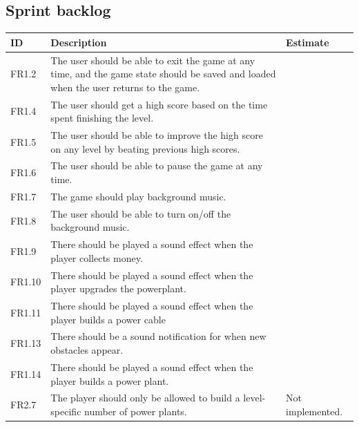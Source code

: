 \subsection{Sprint backlog}
	\begin{table}
	\begin{tabular}{| p{1.2cm} | p{8cm} | p{3cm} |}
		\hline
		\rowcolor{gray}
		ID & Description & Estimate \\ \hline
		FR1.2 &  The user should be able to exit the game at any time, and the game state should be saved and loaded when the user returns to the game. & \\ \hline

		FR1.4 & The user should get a high score based on the time spent finishing the level. & \\ \hline

		FR1.5 & The user should be able to improve the high score on any level by beating previous high scores. & \\ \hline

		FR1.6 & The user should be able to pause the game at any time. & \\ \hline

		FR1.7 & The game should play background music. & \\ \hline

		FR1.8 & The user should be able to turn on/off the background music. & \\ \hline

		FR1.9 & There should be played a sound effect when the player collects money. & \\ \hline

		FR1.10 & There should be played a sound effect when the player upgrades the powerplant. & \\ \hline

		FR1.11 & There should be played a sound effect when the player builds a power cable & \\ \hline

		FR1.13 & There should be a sound notification for when new obstacles appear. & \\ \hline

		FR1.14 & There should be played a sound effect when the player builds a power plant. & \\ \hline

		FR2.7 & The player should only be allowed to build a level-specific number of power plants. & Not implemented. \\ \hline


\end{tabular}
\end{table}

